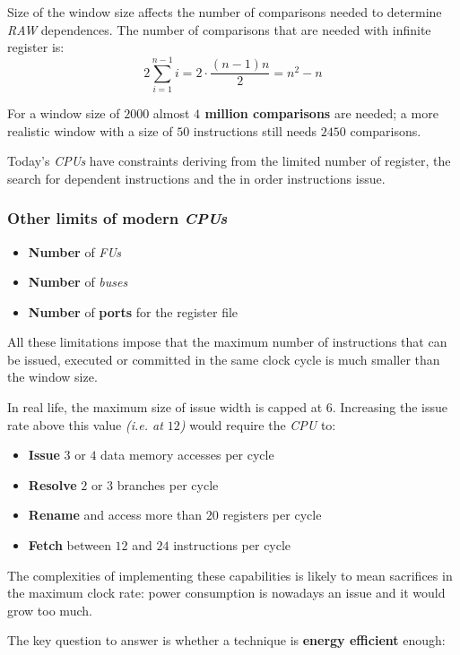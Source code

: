\documentclass[english]{article}
\begin{document}
Size of the window size affects the number of comparisons needed to determine \textit{RAW} dependences.
The number of comparisons that are needed with infinite register is:
\[ \displaystyle 2 \sum^{n-1}_{i=1} i = 2 \cdot \dfrac{(n-1)n}{2} = n^2 - n \]

For a window size of \(2000\) almost \textbf{\(4\) million comparisons} are needed;
a more realistic window with a size of \(50\) instructions still needs \(2450\) comparisons.

Today's \textit{CPUs} have constraints deriving from the limited number of register, the search for dependent instructions and the in order instructions issue.

\subsubsection{Other limits of modern \textit{CPUs}}

\begin{itemize}
  \item \textbf{Number} of \textit{FUs}
  \item \textbf{Number} of \textit{buses}
  \item \textbf{Number} of \textbf{ports} for the register file
\end{itemize}

All these limitations impose that the maximum number of instructions that can be issued, executed or committed in the same clock cycle is much smaller than the window size.

In real life, the maximum size of issue width is capped at \(6\).
Increasing the issue rate above this value \textit{(i.e. at \(12\))} would require the \textit{CPU} to:
\begin{itemize}
  \item \textbf{Issue} \(3\) or \(4\) data memory accesses per cycle
  \item \textbf{Resolve} \(2\) or \(3\) branches per cycle
  \item \textbf{Rename} and access more than \(20\) registers per cycle
  \item \textbf{Fetch} between \(12\) and \(24\) instructions per cycle
\end{itemize}

The complexities of implementing these capabilities is likely to mean sacrifices in the maximum clock rate:
power consumption is nowadays an issue and it would grow too much.

The key question to answer is whether a technique is \textbf{energy efficient} enough:
\end{document}
